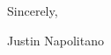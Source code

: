 \documentclass{cover-letter-class}
\begin{document}
{    %

    \vspace{1em}

    \noindent
    Sincerely,

    \vspace{1em}

    \noindent
    Justin Napolitano
}
\end{document}
